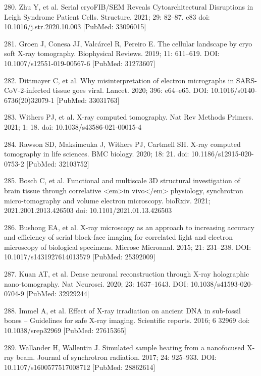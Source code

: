 \documentclass{article}
\begin{document}
\begin{hangpars}
280. Zhu Y, et al. Serial cryoFIB/SEM Reveals Cytoarchitectural Disruptions in Leigh Syndrome Patient Cells. Structure. 2021; 29: 82–87. e83 doi: 10.1016/j.str.2020.10.003 [PubMed: 33096015]

281. Groen J, Conesa JJ, Valcárcel R, Pereiro E. The cellular landscape by cryo soft X-ray tomography. Biophysical Reviews. 2019; 11: 611–619. DOI: 10.1007/s12551-019-00567-6 [PubMed: 31273607]

282. Dittmayer C, et al. Why misinterpretation of electron micrographs in SARS-CoV-2-infected tissue goes viral. Lancet. 2020; 396: e64–e65. DOI: 10.1016/s0140-6736(20)32079-1 [PubMed: 33031763]

283. Withers PJ, et al. X-ray computed tomography. Nat Rev Methods Primers. 2021; 1: 18. doi: 10.1038/s43586-021-00015-4

284. Rawson SD, Maksimcuka J, Withers PJ, Cartmell SH. X-ray computed tomography in life sciences. BMC biology. 2020; 18: 21. doi: 10.1186/s12915-020-0753-2 [PubMed: 32103752]

285. Bosch C, et al. Functional and multiscale 3D structural investigation of brain tissue through correlative <em>in vivo</em> physiology, synchrotron micro-tomography and volume electron microscopy. bioRxiv. 2021; 2021.2001.2013.426503 doi: 10.1101/2021.01.13.426503

286. Bushong EA, et al. X-ray microscopy as an approach to increasing accuracy and efficiency of serial block-face imaging for correlated light and electron microscopy of biological specimens. Microsc Microanal. 2015; 21: 231–238. DOI: 10.1017/s1431927614013579 [PubMed: 25392009]

287. Kuan AT, et al. Dense neuronal reconstruction through X-ray holographic nano-tomography. Nat Neurosci. 2020; 23: 1637–1643. DOI: 10.1038/s41593-020-0704-9 [PubMed: 32929244]

288. Immel A, et al. Effect of X-ray irradiation on ancient DNA in sub-fossil bones – Guidelines for safe X-ray imaging. Scientific reports. 2016; 6 32969 doi: 10.1038/srep32969 [PubMed: 27615365]

289. Wallander H, Wallentin J. Simulated sample heating from a nanofocused X-ray beam. Journal of synchrotron radiation. 2017; 24: 925–933. DOI: 10.1107/s1600577517008712 [PubMed: 28862614]

\end{hangpars}
\end{document}
